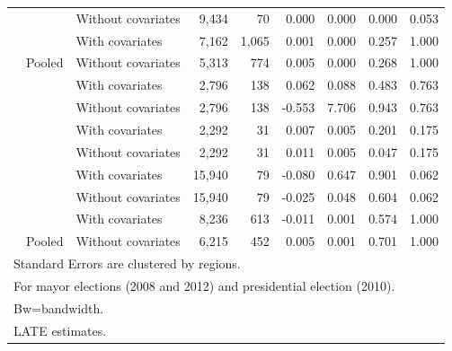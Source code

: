 \documentclass[
  12pt,
]{article}
\begin{document}
\begin{table}[H]
\begin{tabular}[t]{lllrrrrrr}
 & \multirow{-2}{*}{\raggedright\arraybackslash 60000} & Without covariates & 9,434 & 70 & 0.000 & 0.000 & 0.000 & 0.053\\


 &  & With covariates & 7,162 & 1,065 & 0.001 & 0.000 & 0.257 & 1.000\\


\multirow{-8}{*}{\raggedright\arraybackslash 2010} & Pooled & Without covariates & 5,313 & 774 & 0.005 & 0.000 & 0.268 & 1.000\\
\cmidrule{1-9}
 &  & With covariates & 2,796 & 138 & 0.062 & 0.088 & 0.483 & 0.763\\


 & \multirow{-2}{*}{\raggedright\arraybackslash 20000} & Without covariates & 2,796 & 138 & -0.553 & 7.706 & 0.943 & 0.763\\


 &  & With covariates & 2,292 & 31 & 0.007 & 0.005 & 0.201 & 0.175\\


 & \multirow{-2}{*}{\raggedright\arraybackslash 40000} & Without covariates & 2,292 & 31 & 0.011 & 0.005 & 0.047 & 0.175\\


 &  & With covariates & 15,940 & 79 & -0.080 & 0.647 & 0.901 & 0.062\\


 & \multirow{-2}{*}{\raggedright\arraybackslash 60000} & Without covariates & 15,940 & 79 & -0.025 & 0.048 & 0.604 & 0.062\\


 &  & With covariates & 8,236 & 613 & -0.011 & 0.001 & 0.574 & 1.000\\


\multirow{-8}{*}{\raggedright\arraybackslash 2012} & Pooled & Without covariates & 6,215 & 452 & 0.005 & 0.001 & 0.701 & 1.000\\
\bottomrule
\multicolumn{9}{l}{Standard Errors are clustered by regions.}\\
\multicolumn{9}{l}{For mayor elections (2008 and 2012) and presidential election (2010).}\\
\multicolumn{9}{l}{Bw=bandwidth.}\\
\multicolumn{9}{l}{LATE estimates.}\\
\end{tabular}
\end{table}
\end{document}
